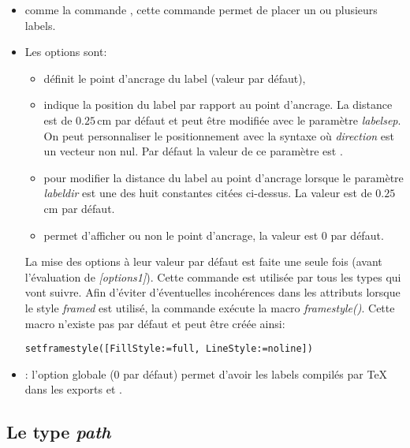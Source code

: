 \begin{itemize}
 \item\desc comme la commande , cette commande permet de placer un ou plusieurs labels.
 \item Les options sont:
  \begin{itemize}
  \item {} définit le point d'ancrage du label (valeur  par défaut),
  \item {} indique la position du label par rapport au point d'ancrage. La distance est de $0.25$\,cm par défaut et peut être modifiée avec le paramètre \emph{labelsep}. On peut personnaliser le positionnement avec la syntaxe  où \emph{direction} est un vecteur non nul. Par défaut la valeur de ce paramètre est .
  \item {} pour modifier la distance du label au point d'ancrage lorsque le paramètre \emph{labeldir} est une des huit constantes citées ci-dessus. La valeur est de $0.25$\,cm par défaut.
  \item {} permet d'afficher ou non le point d'ancrage, la valeur est $0$ par défaut.
  \end{itemize}
  La mise des options à leur valeur par défaut est faite une seule fois (avant l'évaluation de \emph{[options1]}). Cette commande est utilisée par tous les types qui vont suivre. Afin d'éviter d'éventuelles incohérences dans les attributs lorsque le style \emph{framed} est utilisé, la commande exécute la macro \emph{framestyle()}. Cette macro n'existe pas par défaut et peut être créée ainsi:

{\centering \texttt{setframestyle([FillStyle:=full, LineStyle:=noline])}\par}
 \item \noindent{} : l'option globale  ($0$ par défaut) permet d'avoir les labels compilés par \TeX{} dans les exports  et .
\end{itemize}

\subsection{Le type \emph{path}}\label{typepath}

{\centering {}\par}

